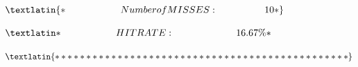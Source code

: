 \documentclass{article}
\begin{document}
$
\textlatin
{
*       \hspace{2cm}      Number of MISSES :        \hspace{1.7cm}       10 *
}
$

$
\textlatin
{
*      \hspace{2cm}       HIT RATE :          \hspace{2.25cm}         16.67\% *
}
$

$
\textlatin
{
***********************************************
}
$






\newpage

\begin{center}
    \vspace*{\fill}
    \setlength{\fboxrule}{1.1pt}
    \setlength{\fboxsep}{7pt}
    \vspace*{\fill}
\end{center}


\end{document}
